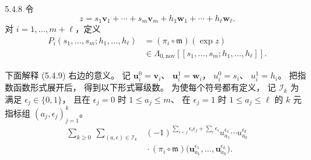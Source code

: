\begin{definition}{5.4.8}\label{def:5-4-8}
令
\[
z=s_1\mathbf v_1+\cdots+s_m\mathbf v_m
+h_1\mathbf w_1+\cdots+h_\ell\mathbf w_\ell.
\]
对 $i=1,\ldots,m+\ell$，定义
\begin{equation}
\begin{aligned}
P_i(s_1,\ldots,s_m;
h_1,\ldots,h_\ell)
&=(\pi_i\circ\mathfrak m)(\exp z)\\
&\in
\Lambda_{0,\mathrm{nov}}
[[s_1,\ldots,s_m;h_1,\ldots,h_\ell]].
\end{aligned}
\tag{5.4.9}\label{eq:5-4-9}
\end{equation}
\end{definition}

下面解释 (5.4.9) 右边的意义。
记
$\mathbf u_i^0=\mathbf v_i$、
$\mathbf u_i^1=\mathbf w_i$，
$u_i^0=s_i$、
$u_i^1=h_i$。
把指数函数形式展开后，
得到以下形式幂级数。
为使每个符号都有定义，
记 $\mathcal I_k$ 为
满足 $\epsilon_j\in\{0,1\}$，
且在 $\epsilon_j=0$ 时
$1\le a_j\le m$、
在 $\epsilon_j=1$ 时
$1\le a_j\le\ell$ 的
$k$ 元指标组 $(a_j,\epsilon_j)_{j=1}^k$。
\begin{equation}
\begin{aligned}
\sum_{k\ge0}
\ \sum_{(a,\epsilon)\in\mathcal I_k}
&(-1)^{
\sum_{i<j}\epsilon_i\epsilon_j
+\sum_i\epsilon_i}
u_{a_1}^{\epsilon_1}
\cdots
u_{a_k}^{\epsilon_k}\\
&{}\cdot
(\pi_i\circ\mathfrak m)
\bigl(
\mathbf u_{a_1}^{\epsilon_1},
\ldots,
\mathbf u_{a_k}^{\epsilon_k}
\bigr).
\end{aligned}
\tag{5.4.10}\label{eq:5-4-10}
\end{equation}


